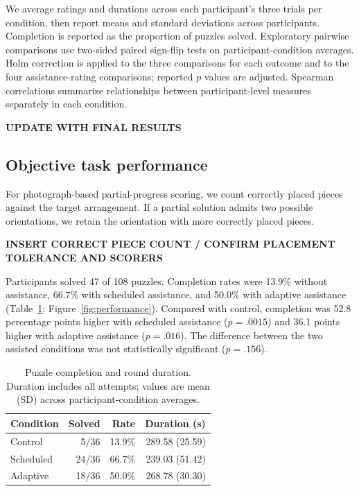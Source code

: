 \documentclass[sigconf,anonymous]{aamas}
\begin{document}
We average ratings and durations across each participant's three trials per condition, then report means and standard deviations across participants. Completion is reported as the proportion of puzzles solved. Exploratory pairwise comparisons use two-sided paired sign-flip tests on participant-condition averages. Holm correction is applied to the three comparisons for each outcome and to the four assistance-rating comparisons; reported $p$ values are adjusted. Spearman correlations summarize relationships between participant-level measures separately in each condition.

\textbf{UPDATE WITH FINAL RESULTS}

\subsection{Objective task performance}

For photograph-based partial-progress scoring, we count correctly placed pieces against the target arrangement. If a partial solution admits two possible orientations, we retain the orientation with more correctly placed pieces.

\textbf{INSERT CORRECT PIECE COUNT / CONFIRM PLACEMENT TOLERANCE AND SCORERS}

Participants solved 47 of 108 puzzles. Completion rates were 13.9\% without assistance, 66.7\% with scheduled assistance, and 50.0\% with adaptive assistance (Table~\ref{tab:performance}; Figure~\ref{fig:performance}). Compared with control, completion was 52.8 percentage points higher with scheduled assistance ($p=.0015$) and 36.1 points higher with adaptive assistance ($p=.016$). The difference between the two assisted conditions was not statistically significant ($p=.156$).

\begin{table}[t]
\centering
\caption{Puzzle completion and round duration. Duration includes all attempts; values are mean (SD) across participant-condition averages.}
\label{tab:performance}
\begin{tabular}{lrrr}
\toprule
Condition & Solved & Rate & Duration (s) \\
\midrule
Control & 5/36 & 13.9\% & 289.58 (25.59) \\
Scheduled & 24/36 & 66.7\% & 239.03 (51.42) \\
Adaptive & 18/36 & 50.0\% & 268.78 (30.30) \\
\bottomrule
\end{tabular}
\end{table}
\end{document}
